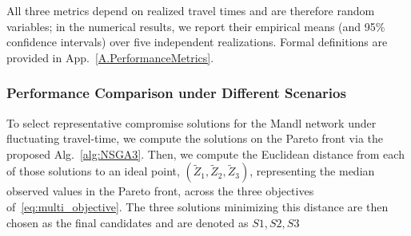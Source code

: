 \documentclass[a4paper,fleqn]{cas-sc}
\begin{document}
All three metrics depend on realized travel times and are therefore random
variables; in the numerical results, we report their empirical means (and
95\% confidence intervals) over five independent realizations. Formal definitions are provided in App.~\ref{A.PerformanceMetrics}.

\subsubsection{Performance Comparison under Different Scenarios}\label{sec:mandl_RESULT1}

To select representative compromise solutions for the Mandl network under fluctuating travel-time, we compute the solutions on the Pareto front via the proposed Alg.~\ref{alg:NSGA3}. Then, we compute the Euclidean distance from each of those solutions to an ideal point, $(\tilde{Z}_1, \tilde{Z}_2, \tilde{Z}_3)$, representing the median observed values in the Pareto front, across the three objectives of~\eqref{eq:multi_objective}. The three solutions minimizing this distance are then chosen as the final candidates and are denoted as $S1, S2, S3$
\end{document}
